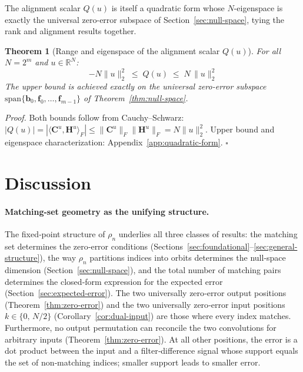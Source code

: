 \documentclass[10pt,a4paper]{amsart}
\newtheorem{theorem}{Theorem}
\begin{document}
\medskip
\noindent The alignment scalar $Q(u)$ is itself a quadratic form whose $N$-eigenspace is exactly the universal zero-error subspace of Section~\ref{sec:null-space}, tying the rank and alignment results together.

\medskip
\begin{theorem}[Range and eigenspace of the alignment scalar $Q(u)$]\label{thm:lambda-max}
For all $N = 2^m$ and $u \in \mathbb{R}^N$:
\begin{equation}
    -N\|u\|_2^2 \;\leq\; Q(u) \;\leq\; N\,\|u\|_2^2
\end{equation}
The upper bound is achieved exactly on the universal zero-error subspace $\mathrm{span}\{\mathbf{b}_0, \mathbf{f}_0, \ldots, \mathbf{f}_{m-1}\}$ of Theorem~\ref{thm:null-space}.
\end{theorem}

\noindent\textit{Proof.} Both bounds follow from Cauchy--Schwarz: $|Q(u)| = |\langle\mathbf{C}^u,\mathbf{H}^u\rangle_F| \leq \|\mathbf{C}^u\|_F\|\mathbf{H}^u\|_F = N\|u\|_2^2$. Upper bound and eigenspace characterization: Appendix~\ref{app:quadratic-form}. $\square$

\section{Discussion}

\paragraph{Matching-set geometry as the unifying structure.}
The fixed‑point structure of $\rho_n$ underlies all three classes of results: the matching set determines the zero‑error conditions (Sections~\ref{sec:foundational}–\ref{sec:general-structure}), the way $\rho_n$ partitions indices into orbits determines the null‑space dimension (Section~\ref{sec:null-space}), and the total number of matching pairs determines the closed‑form expression for the expected error (Section~\ref{sec:expected-error}). The two universally zero‑error output positions (Theorem~\ref{thm:zero-error}) and the two universally zero‑error input positions $k \in \{0,\,N/2\}$ (Corollary~\ref{cor:dual-input}) are those where every index matches. Furthermore, no output permutation can reconcile the two convolutions for arbitrary inputs (Theorem~\ref{thm:zero-error}). At all other positions, the error is a dot product between the input and a filter‑difference signal whose support equals the set of non‑matching indices; smaller support leads to smaller error.
\end{document}
